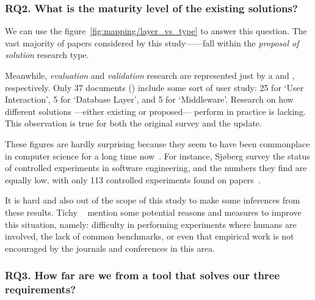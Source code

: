 \subsubsection{RQ2. What is the maturity level of the existing solutions?}
We can use the figure~\ref{fig:mapping/layer_vs_type} to answer this question.
The vast majority of papers considered by this study------fall within the
\emph{proposal of solution} research type.

Meanwhile, \emph{evaluation} and \emph{validation} research are represented
just by a  and , respectively.
Only 37 documents () include some sort of user study:
25 for `User Interaction', 5 for `Database  Layer', and 5 for `Middleware'.
Research on how different solutions ---either existing or proposed--- perform in
practice is lacking. This observation is true for both the original survey and the update.

These figures are hardly surprising because they seem to have been commonplace
in computer science for a long time now~\cite{TICHY1995,ZELKOWITZ1997,Sjoberg2005}.
For instance, Sjøberg \etal survey the status of controlled experiments
in software engineering, and the numbers they find are equally low, with
only 113 controlled experiments found on  papers~\cite{Sjoberg2005}.

It is hard and also out of the scope of this study to make some inferences from these
results. Tichy \etal~\cite{TICHY1995} mention some potential reasons and measures
to improve this situation, namely: difficulty in performing experiments where humans
are involved, the lack of common benchmarks, or even that empirical work is not
encouraged by the journals and conferences in this area.

\subsubsection{RQ3. How far are we from a tool that solves our three requirements?}

